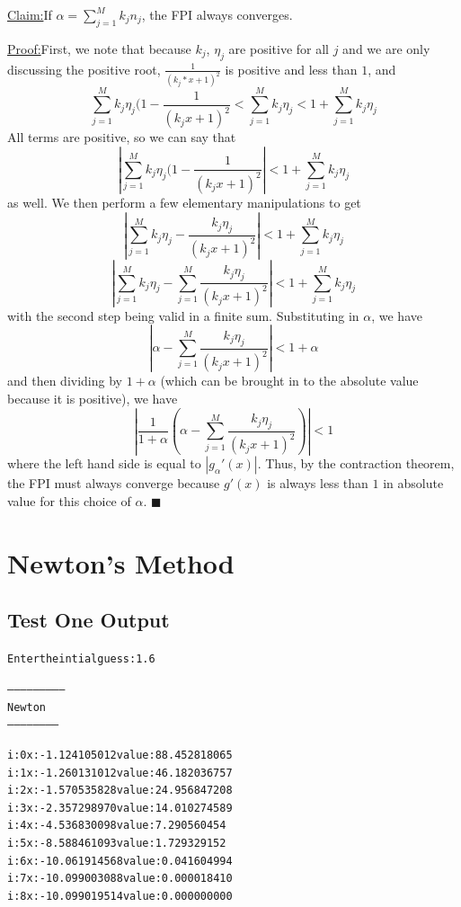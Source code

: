 \documentclass[11pt]{article} %
\newenvironment{claim}[1]{\par\noindent\underline{Claim:}\space#1}{}
\newenvironment{proof}[1]{\par\noindent\underline{Proof:}\space#1}{\hfill $\blacksquare$}
\begin{document}
\begin{claim}
If $\alpha  = \sum_{j=1}^M k_jn_j$, the FPI always converges.
\end{claim} \\
\begin{proof}
First, we note that because $k_j$, $\eta_j$ are positive for all $j$ and we are only discussing the positive root, $\frac{1}{(k_j*x+1)^2}$ is positive and less than $1$, and 
$$\sum_{j=1}^M k_j\eta_j (1 - \frac{1}{(k_jx+1)^2} < \sum_{j=1}^M k_j \eta_j < 1 +  \sum_{j=1}^M k_j \eta_j $$
All terms are positive, so we can say that 
$$|\sum_{j=1}^M k_j\eta_j (1 - \frac{1}{(k_jx+1)^2}| <  1 +  \sum_{j=1}^M k_j \eta_j $$
as well. We then perform a few elementary manipulations to get
$$|\sum_{j=1}^M k_j\eta_j - \frac{ k_j\eta_j }{(k_jx+1)^2}| <  1 +  \sum_{j=1}^M k_j \eta_j $$
$$|\sum_{j=1}^M k_j\eta_j -  \sum_{j=1}^M\frac{ k_j\eta_j }{(k_jx+1)^2}| <  1 +  \sum_{j=1}^M k_j \eta_j $$
with the second step being valid in a finite sum. Substituting in $\alpha$, we have
	$$|\alpha  -  \sum_{j=1}^M\frac{ k_j\eta_j }{(k_jx+1)^2}| <  1 + \alpha $$
and then dividing by $1+\alpha$ (which can be brought in to the absolute value because it is positive), we have
 $$|\frac{1}{1+\alpha}(\alpha - \sum_{j=1}^M\frac{ k_j\eta_j }{(k_jx+1)^2})| < 1$$
where the left hand side is equal to $|g_\alpha'(x)|$. Thus, by the contraction theorem, the FPI must always converge because $g'(x)$ is always less than $1$ in absolute value for this choice of $\alpha$.
\end{proof}


\section*{Newton's Method}

\subsection*{Test One Output}
\begin{alltt}
Enter the intial guess: 1.6

--------------------------
 Newton
 -----------------------


i: 0	x: -1.124105012	value: 88.452818065
i: 1	x: -1.260131012	value: 46.182036757
i: 2	x: -1.570535828	value: 24.956847208
i: 3	x: -2.357298970	value: 14.010274589
i: 4	x: -4.536830098	value: 7.290560454
i: 5	x: -8.588461093	value: 1.729329152
i: 6	x: -10.061914568	value: 0.041604994
i: 7	x: -10.099003088	value: 0.000018410
i: 8	x: -10.099019514	value: 0.000000000

\end{alltt}
\end{document}

